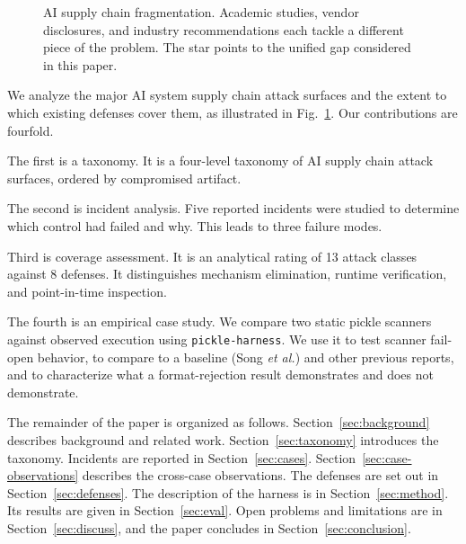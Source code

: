 \documentclass[conference]{IEEEtran}
\begin{document}
\begin{figure}[!t]
\centering
{}
\caption{AI supply chain fragmentation. Academic studies, vendor disclosures, and industry recommendations each tackle a different piece of the problem. The star points to the unified gap considered in this paper.}
\label{fig:venn}
\end{figure}

We analyze the major AI system supply chain attack surfaces and the extent to which existing defenses cover them, as illustrated in Fig.~\ref{fig:venn}. Our contributions are fourfold.

The first is a taxonomy. It is a four-level taxonomy of AI supply chain attack surfaces, ordered by compromised artifact.

The second is incident analysis. Five reported incidents were studied to determine which control had failed and why. This leads to three failure modes.

Third is coverage assessment. It is an analytical rating of 13 attack classes against 8 defenses. It distinguishes mechanism elimination, runtime verification, and point-in-time inspection.

The fourth is an empirical case study. We compare two static pickle scanners against observed execution using \texttt{pickle-harness}. We use it to test scanner fail-open behavior, to compare to a baseline (Song \textit{et al.}) and other previous reports, and to characterize what a format-rejection result demonstrates and does not demonstrate.

The remainder of the paper is organized as follows. Section~\ref{sec:background} describes background and related work. Section~\ref{sec:taxonomy} introduces the taxonomy. Incidents are reported in Section~\ref{sec:cases}. Section~\ref{sec:case-observations} describes the cross-case observations. The defenses are set out in Section~\ref{sec:defenses}. The description of the harness is in Section~\ref{sec:method}. Its results are given in Section~\ref{sec:eval}. Open problems and limitations are in Section~\ref{sec:discuss}, and the paper concludes in Section~\ref{sec:conclusion}.
\end{document}
